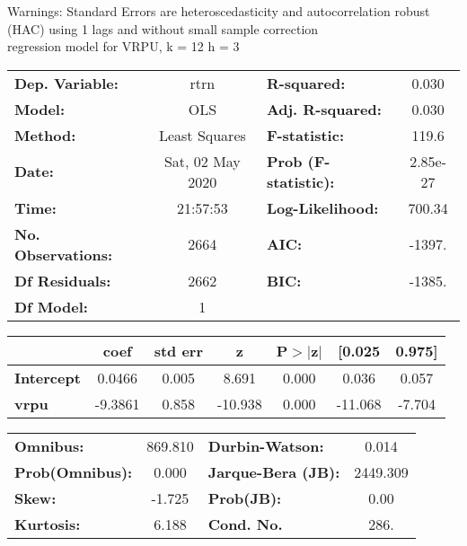 Warnings: \newline
 [1] Standard Errors are heteroscedasticity and autocorrelation robust (HAC) using 1 lags and without small sample correction\\ 

regression model for VRPU, k = 12 h = 3\begin{center}
\begin{tabular}{lclc}
\toprule
\textbf{Dep. Variable:}    &       rtrn       & \textbf{  R-squared:         } &     0.030   \\
\textbf{Model:}            &       OLS        & \textbf{  Adj. R-squared:    } &     0.030   \\
\textbf{Method:}           &  Least Squares   & \textbf{  F-statistic:       } &     119.6   \\
\textbf{Date:}             & Sat, 02 May 2020 & \textbf{  Prob (F-statistic):} &  2.85e-27   \\
\textbf{Time:}             &     21:57:53     & \textbf{  Log-Likelihood:    } &    700.34   \\
\textbf{No. Observations:} &        2664      & \textbf{  AIC:               } &    -1397.   \\
\textbf{Df Residuals:}     &        2662      & \textbf{  BIC:               } &    -1385.   \\
\textbf{Df Model:}         &           1      & \textbf{                     } &             \\
\bottomrule
\end{tabular}
\begin{tabular}{lcccccc}
                   & \textbf{coef} & \textbf{std err} & \textbf{z} & \textbf{P$> |$z$|$} & \textbf{[0.025} & \textbf{0.975]}  \\
\midrule
\textbf{Intercept} &       0.0466  &        0.005     &     8.691  &         0.000        &        0.036    &        0.057     \\
\textbf{vrpu}      &      -9.3861  &        0.858     &   -10.938  &         0.000        &      -11.068    &       -7.704     \\
\bottomrule
\end{tabular}
\begin{tabular}{lclc}
\textbf{Omnibus:}       & 869.810 & \textbf{  Durbin-Watson:     } &    0.014  \\
\textbf{Prob(Omnibus):} &   0.000 & \textbf{  Jarque-Bera (JB):  } & 2449.309  \\
\textbf{Skew:}          &  -1.725 & \textbf{  Prob(JB):          } &     0.00  \\
\textbf{Kurtosis:}      &   6.188 & \textbf{  Cond. No.          } &     286.  \\
\bottomrule
\end{tabular}
\end{center}

